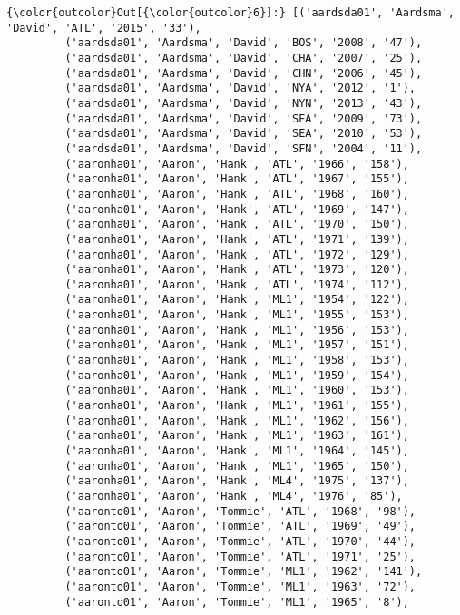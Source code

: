\documentclass[11pt]{article}
\begin{document}
\begin{Verbatim}[commandchars=\\\{\}]
{\color{outcolor}Out[{\color{outcolor}6}]:} [('aardsda01', 'Aardsma', 'David', 'ATL', '2015', '33'),
         ('aardsda01', 'Aardsma', 'David', 'BOS', '2008', '47'),
         ('aardsda01', 'Aardsma', 'David', 'CHA', '2007', '25'),
         ('aardsda01', 'Aardsma', 'David', 'CHN', '2006', '45'),
         ('aardsda01', 'Aardsma', 'David', 'NYA', '2012', '1'),
         ('aardsda01', 'Aardsma', 'David', 'NYN', '2013', '43'),
         ('aardsda01', 'Aardsma', 'David', 'SEA', '2009', '73'),
         ('aardsda01', 'Aardsma', 'David', 'SEA', '2010', '53'),
         ('aardsda01', 'Aardsma', 'David', 'SFN', '2004', '11'),
         ('aaronha01', 'Aaron', 'Hank', 'ATL', '1966', '158'),
         ('aaronha01', 'Aaron', 'Hank', 'ATL', '1967', '155'),
         ('aaronha01', 'Aaron', 'Hank', 'ATL', '1968', '160'),
         ('aaronha01', 'Aaron', 'Hank', 'ATL', '1969', '147'),
         ('aaronha01', 'Aaron', 'Hank', 'ATL', '1970', '150'),
         ('aaronha01', 'Aaron', 'Hank', 'ATL', '1971', '139'),
         ('aaronha01', 'Aaron', 'Hank', 'ATL', '1972', '129'),
         ('aaronha01', 'Aaron', 'Hank', 'ATL', '1973', '120'),
         ('aaronha01', 'Aaron', 'Hank', 'ATL', '1974', '112'),
         ('aaronha01', 'Aaron', 'Hank', 'ML1', '1954', '122'),
         ('aaronha01', 'Aaron', 'Hank', 'ML1', '1955', '153'),
         ('aaronha01', 'Aaron', 'Hank', 'ML1', '1956', '153'),
         ('aaronha01', 'Aaron', 'Hank', 'ML1', '1957', '151'),
         ('aaronha01', 'Aaron', 'Hank', 'ML1', '1958', '153'),
         ('aaronha01', 'Aaron', 'Hank', 'ML1', '1959', '154'),
         ('aaronha01', 'Aaron', 'Hank', 'ML1', '1960', '153'),
         ('aaronha01', 'Aaron', 'Hank', 'ML1', '1961', '155'),
         ('aaronha01', 'Aaron', 'Hank', 'ML1', '1962', '156'),
         ('aaronha01', 'Aaron', 'Hank', 'ML1', '1963', '161'),
         ('aaronha01', 'Aaron', 'Hank', 'ML1', '1964', '145'),
         ('aaronha01', 'Aaron', 'Hank', 'ML1', '1965', '150'),
         ('aaronha01', 'Aaron', 'Hank', 'ML4', '1975', '137'),
         ('aaronha01', 'Aaron', 'Hank', 'ML4', '1976', '85'),
         ('aaronto01', 'Aaron', 'Tommie', 'ATL', '1968', '98'),
         ('aaronto01', 'Aaron', 'Tommie', 'ATL', '1969', '49'),
         ('aaronto01', 'Aaron', 'Tommie', 'ATL', '1970', '44'),
         ('aaronto01', 'Aaron', 'Tommie', 'ATL', '1971', '25'),
         ('aaronto01', 'Aaron', 'Tommie', 'ML1', '1962', '141'),
         ('aaronto01', 'Aaron', 'Tommie', 'ML1', '1963', '72'),
         ('aaronto01', 'Aaron', 'Tommie', 'ML1', '1965', '8'),

\end{Verbatim}
\end{document}
